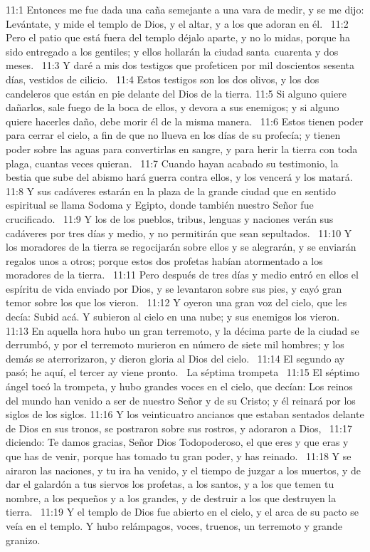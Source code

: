 11:1 Entonces me fue dada una caña semejante a una vara de medir, y se me dijo: Levántate, y mide el templo de Dios, y el altar, y a los que adoran en él.  
11:2 Pero el patio que está fuera del templo déjalo aparte, y no lo midas, porque ha sido entregado a los gentiles; y ellos hollarán la ciudad santa cuarenta y dos meses.  
11:3 Y daré a mis dos testigos que profeticen por mil doscientos sesenta días, vestidos de cilicio.  
11:4 Estos testigos son los dos olivos, y los dos candeleros que están en pie delante del Dios de la tierra. 
11:5 Si alguno quiere dañarlos, sale fuego de la boca de ellos, y devora a sus enemigos; y si alguno quiere hacerles daño, debe morir él de la misma manera.  
11:6 Estos tienen poder para cerrar el cielo, a fin de que no llueva en los días de su profecía; y tienen poder sobre las aguas para convertirlas en sangre, y para herir la tierra con toda plaga, cuantas veces quieran.  
11:7 Cuando hayan acabado su testimonio, la bestia que sube del abismo hará guerra contra ellos, y los vencerá y los matará.  
11:8 Y sus cadáveres estarán en la plaza de la grande ciudad que en sentido espiritual se llama Sodoma y Egipto, donde también nuestro Señor fue crucificado.  
11:9 Y los de los pueblos, tribus, lenguas y naciones verán sus cadáveres por tres días y medio, y no permitirán que sean sepultados.  
11:10 Y los moradores de la tierra se regocijarán sobre ellos y se alegrarán, y se enviarán regalos unos a otros; porque estos dos profetas habían atormentado a los moradores de la tierra.  
11:11 Pero después de tres días y medio entró en ellos el espíritu de vida enviado por Dios, y se levantaron sobre sus pies, y cayó gran temor sobre los que los vieron.  
11:12 Y oyeron una gran voz del cielo, que les decía: Subid acá. Y subieron al cielo en una nube; y sus enemigos los vieron.  
11:13 En aquella hora hubo un gran terremoto, y la décima parte de la ciudad se derrumbó, y por el terremoto murieron en número de siete mil hombres; y los demás se aterrorizaron, y dieron gloria al Dios del cielo.  
11:14 El segundo ay pasó; he aquí, el tercer ay viene pronto.  
La séptima trompeta  
11:15 El séptimo ángel tocó la trompeta, y hubo grandes voces en el cielo, que decían: Los reinos del mundo han venido a ser de nuestro Señor y de su Cristo; y él reinará por los siglos de los siglos. 
11:16 Y los veinticuatro ancianos que estaban sentados delante de Dios en sus tronos, se postraron sobre sus rostros, y adoraron a Dios,  
11:17 diciendo: Te damos gracias, Señor Dios Todopoderoso, el que eres y que eras y que has de venir, porque has tomado tu gran poder, y has reinado.  
11:18 Y se airaron las naciones, y tu ira ha venido, y el tiempo de juzgar a los muertos, y de dar el galardón a tus siervos los profetas, a los santos, y a los que temen tu nombre, a los pequeños y a los grandes, y de destruir a los que destruyen la tierra.  
11:19 Y el templo de Dios fue abierto en el cielo, y el arca de su pacto se veía en el templo. Y hubo relámpagos, voces, truenos, un terremoto y grande granizo. 
